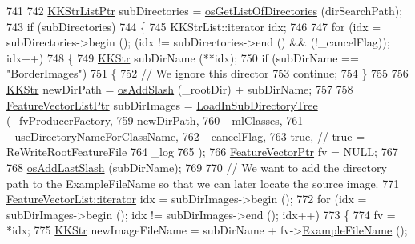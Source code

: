 \begin{DoxyCode}
741 
742   \hyperlink{class_k_k_b_1_1_k_k_str_list}{KKStrListPtr}  subDirectories = \hyperlink{namespace_k_k_b_a5a4fe85032282128eb06725d1f8e8b53}{osGetListOfDirectories} (dirSearchPath);
743   \textcolor{keywordflow}{if}  (subDirectories)
744   \{
745     KKStrList::iterator  idx;
746 
747     \textcolor{keywordflow}{for}  (idx = subDirectories->begin ();  (idx != subDirectories->end ()  &&  (!\_cancelFlag));   idx++)
748     \{
749       \hyperlink{class_k_k_b_1_1_k_k_str}{KKStr}  subDirName (**idx);
750       \textcolor{keywordflow}{if}  (subDirName == \textcolor{stringliteral}{"BorderImages"})
751       \{
752         \textcolor{comment}{// We ignore this director}
753         \textcolor{keywordflow}{continue};
754       \}
755 
756       \hyperlink{class_k_k_b_1_1_k_k_str}{KKStr}  newDirPath = \hyperlink{namespace_k_k_b_aa0d40119b911df4283399a1724cab1ef}{osAddSlash} (\_rootDir) + subDirName;
757 
758       \hyperlink{class_k_k_m_l_l_1_1_feature_vector_list}{FeatureVectorListPtr}  subDirImages = 
      \hyperlink{class_k_k_m_l_l_1_1_feature_file_i_o_abce09712a763ba49bf0cc55d0fdae784}{LoadInSubDirectoryTree} (\_fvProducerFactory,
759                                                                    newDirPath, 
760                                                                    \_mlClasses, 
761                                                                    \_useDirectoryNameForClassName, 
762                                                                    \_cancelFlag,
763                                                                    \textcolor{keyword}{true},     \textcolor{comment}{// true =
       ReWriteRootFeatureFile}
764                                                                    \_log
765                                                                   );
766       \hyperlink{class_k_k_m_l_l_1_1_feature_vector}{FeatureVectorPtr}  fv = NULL;
767 
768       \hyperlink{namespace_k_k_b_a60e413a66cd7d3a5679d2844dd5e3d97}{osAddLastSlash} (subDirName);
769 
770       \textcolor{comment}{// We want to add the directory path to the ExampleFileName so that we can later locate the source
       image.}
771       \hyperlink{class_k_k_b_1_1_k_k_queue_aa3c2796a726eea468b94132a9fbf2cfe}{FeatureVectorList::iterator}  idx = subDirImages->begin ();
772       \textcolor{keywordflow}{for}  (idx = subDirImages->begin ();  idx != subDirImages->end ();  idx++)
773       \{
774         fv = *idx;
775         \hyperlink{class_k_k_b_1_1_k_k_str}{KKStr}  newImageFileName = subDirName + fv->\hyperlink{class_k_k_m_l_l_1_1_feature_vector_ab47c89ab1e9396664fdc0dc34b6e1ab5}{ExampleFileName} ();

\end{DoxyCode}
